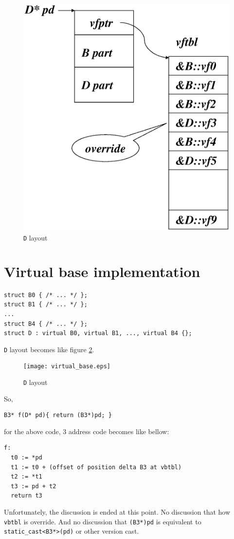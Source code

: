 \documentclass{article}
\begin{document}
\vspace{0.5cm}
\begin{figure}[htbp]
\begin{center}
\includegraphics[width=0.91\linewidth,height=1.0\linewidth]{virtual_function2.eps}
\caption{{\tt{D}} layout}
\label{derived_e002}
\end{center}
\end{figure}

\section{Virtual base implementation}

\begin{verbatim}
struct B0 { /* ... */ };
struct B1 { /* ... */ };
...
struct B4 { /* ... */ };
struct D : virtual B0, virtual B1, ..., virtual B4 {};
\end{verbatim}
{\tt {D}} layout becomes like figure \ref{derived_e001}.

\vspace{0.5cm}
\begin{figure}[htbp]
\begin{center}
\texttt{[image: virtual\_base.eps]}
\caption{{\tt{D}} layout}
\label{derived_e001}
\end{center}
\end{figure}

So,
\begin{verbatim}
B3* f(D* pd){ return (B3*)pd; }
\end{verbatim}
for the above code, 3 address code becomes like bellow:
\begin{verbatim}
f:
  t0 := *pd
  t1 := t0 + (offset of position delta B3 at vbtbl)
  t2 := *t1
  t3 := pd + t2
  return t3
\end{verbatim}

Unfortunately, the discussion is ended at this point. No discussion that
how {\tt{vbtbl}} is override. And no discussion that {\tt{(B3*)pd}}
is equivalent to {\tt{static\_cast<B3*>(pd)}} or other version cast.  
\end{document}
